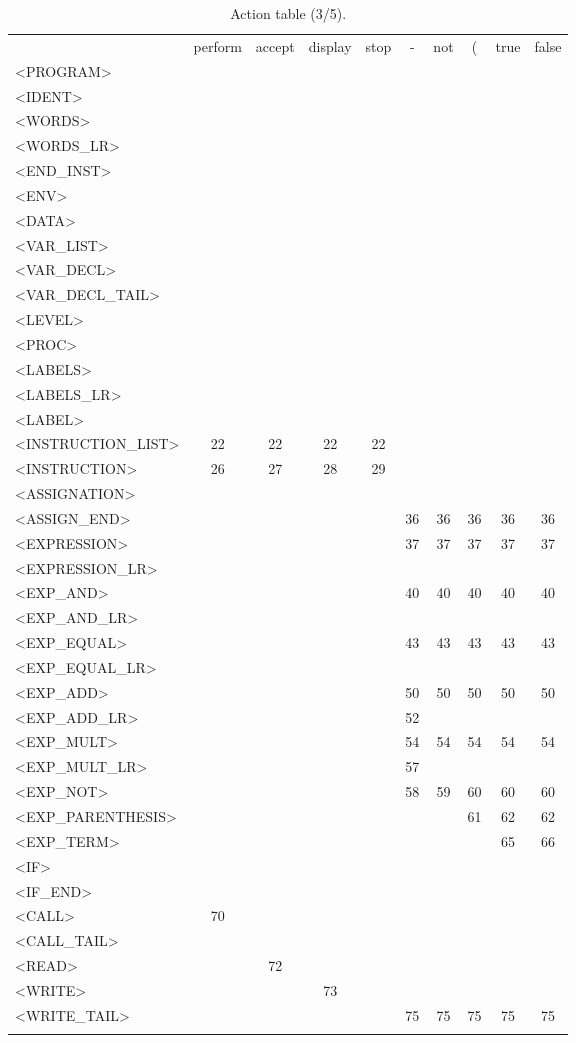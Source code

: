 \documentclass[a4paper,11pt]{article}
\begin{document}
\newpage
\begin{longtable}{l||ccccccccc}
	& perform & accept & display & stop & - & not & ( & true & false\\
	<PROGRAM> & & & & & & & & & \\
	<IDENT>& & & & & & & & & \\
	<WORDS> & & & & & & & & & \\
	<WORDS\_LR> & & & & & & & & & \\
	<END\_INST>& & & & & & & & & \\
	<ENV>& & & & & & & & & \\
	<DATA> & & & & & & & & & \\
	<VAR\_LIST>& & & & & & & & & \\
	<VAR\_DECL> & & & & & & & & & \\
	<VAR\_DECL\_TAIL>& & & & & & & & & \\
	<LEVEL>& & & & & & & & & \\
	<PROC>& & & & & & & & & \\
	<LABELS>& & & & & & & & & \\
	<LABELS\_LR> & & & & & & & & & \\
	<LABEL> & & & & & & & & & \\
	<INSTRUCTION\_LIST>& 22 & 22 & 22 & 22 & & & & & \\
	<INSTRUCTION>& 26 & 27 & 28 & 29 & & & & & \\
	<ASSIGNATION>& & & & & & & & & \\
	<ASSIGN\_END>& & & & & 36 & 36 & 36& 36 & 36 \\
	<EXPRESSION> & & & & & 37 & 37 & 37 & 37 & 37 \\
	<EXPRESSION\_LR>& & & & & & & & & \\
	<EXP\_AND> & & & & & 40 & 40 & 40 & 40 & 40 \\
	<EXP\_AND\_LR>& & & & & & & & & \\
	<EXP\_EQUAL> & & & & & 43 & 43 & 43 & 43 & 43 \\
	<EXP\_EQUAL\_LR>& & & & & & & & & \\
	<EXP\_ADD> & & & & & 50 & 50 & 50 & 50 & 50 \\
	<EXP\_ADD\_LR>& & & & & 52 & & & & \\
	<EXP\_MULT> & & & & & 54 & 54 & 54 & 54 & 54 \\
	<EXP\_MULT\_LR>& & & & & 57 & & & & \\
	<EXP\_NOT> & & & & & 58 & 59 & 60 & 60 & 60 \\
	<EXP\_PARENTHESIS> & & & & & & & 61 & 62 & 62 \\
	<EXP\_TERM> & & & & & & & & 65 & 66 \\
	<IF> & & & & & & & & & \\
	<IF\_END> & & & & & & & & & \\
	<CALL> & 70 & & & & & & & & \\
	<CALL\_TAIL>& & & & & & & & & \\
	<READ> & & 72 & & & & & & & \\
	<WRITE>& & & 73 & & & & & & \\
	<WRITE\_TAIL> & & & & & 75 & 75 & 75 & 75 & 75 \\
	\caption{Action table (3/5).}
\end{longtable}
\end{document}
